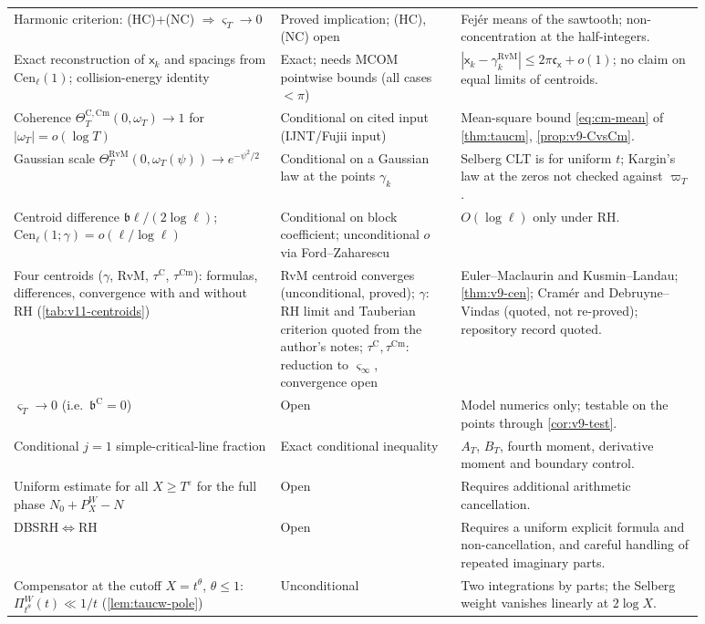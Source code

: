 \documentclass[11pt,a4paper]{article}
\numberwithin{equation}{section}
\theoremstyle{definition}
\theoremstyle{remark}
\newcommand{\Cm}{\mathrm{Cm}}
\begin{document}
\begin{longtable}{@{}p{0.34\linewidth}>{\raggedright\arraybackslash}p{0.23\linewidth}p{0.31\linewidth}@{}}
Harmonic criterion: (HC)+(NC) $\Rightarrow\varsigma_T\to0$ & Proved implication; (HC), (NC) open & Fej\'er means of the sawtooth; non-concentration at the half-integers.\\
Exact reconstruction of $\mathsf x_k$ and spacings from $\mathrm{Cen}_\ell(1)$; collision-energy identity & Exact; needs MCOM pointwise bounds (all cases $<\pi$) & $|\mathsf x_k-\gamma_k^{\mathrm{RvM}}|\le2\pi\mathfrak c_{\mathsf x}+o(1)$; no claim on equal limits of centroids.\\
Coherence $\Theta^{\mathrm C,\Cm}_T(0,\omega_T)\to1$ for $|\omega_T|=o(\log T)$ & Conditional on cited input (IJNT/Fujii input) & Mean-square bound \eqref{eq:cm-mean} of \cref{thm:taucm}, \cref{prop:v9-CvsCm}.\\
Gaussian scale $\Theta_T^{\mathrm{RvM}}(0,\omega_T(\psi))\to e^{-\psi^2/2}$ & Conditional on a Gaussian law at the points $\gamma_k$ & Selberg CLT is for uniform $t$; Kargin's law at the zeros not checked against $\varpi_T$.\\
Centroid difference $\mathfrak b\ell/(2\log\ell)$; $\mathrm{Cen}_\ell(1;\gamma)=o(\ell/\log\ell)$ & Conditional on block coefficient; unconditional $o$ via Ford--Zaharescu & $O(\log\ell)$ only under RH.\\
Four centroids ($\gamma$, RvM, $\tau^{\mathrm C}$, $\tau^{\Cm}$): formulas, differences, convergence with and without RH (\cref{tab:v11-centroids}) & RvM centroid converges (unconditional, proved); $\gamma$: RH limit and Tauberian criterion quoted from the author's notes; $\tau^{\mathrm C},\tau^{\Cm}$: reduction to $\varsigma_\infty$, convergence open & Euler--Maclaurin and Kusmin--Landau; \cref{thm:v9-cen}; Cram\'er and Debruyne--Vindas (quoted, not re-proved); repository record quoted.\\
$\varsigma_T\to0$ (i.e.\ $\mathfrak b^{\mathrm C}=0$) & Open & Model numerics only; testable on the points through \cref{cor:v9-test}.\\
Conditional $j=1$ simple-critical-line fraction & Exact conditional inequality & $A_T$, $B_T$, fourth moment, derivative moment and boundary control.\\
Uniform estimate for all $X\ge T^\varepsilon$ for the full phase $N_0+P_X^W-N$ & Open & Requires additional arithmetic cancellation.\\
DBSRH$\Leftrightarrow$RH & Open & Requires a uniform explicit formula and non-cancellation, and careful handling of repeated imaginary parts.\\
Compensator at the cutoff $X=t^\theta$, $\theta\le1$: $\Pi^W_{t^\theta}(t)\ll1/t$ (\cref{lem:taucw-pole}) & Unconditional & Two integrations by parts; the Selberg weight vanishes linearly at $2\log X$.\\

\end{longtable}
\end{document}
